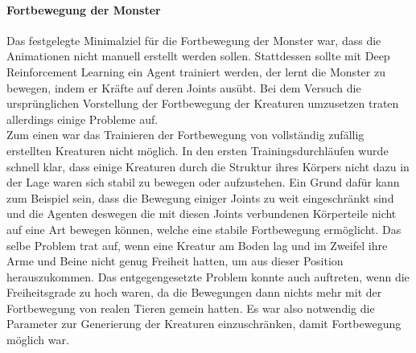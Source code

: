 \paragraph{Fortbewegung der Monster} \fup

Das festgelegte Minimalziel für die Fortbewegung der Monster war, dass die Animationen nicht manuell erstellt werden sollen. 
Stattdessen sollte mit Deep Reinforcement Learning ein Agent trainiert werden, der lernt die Monster zu bewegen, indem er Kräfte auf deren Joints ausübt.
Bei dem Versuch die ursprünglichen Vorstellung der Fortbewegung der Kreaturen umzusetzen traten allerdings einige Probleme auf.\\

Zum einen war das Trainieren der Fortbewegung von vollständig zufällig erstellten Kreaturen nicht möglich. 
In den ersten Trainingsdurchläufen wurde schnell klar, dass einige Kreaturen durch die Struktur ihres Körpers nicht dazu in der Lage waren sich stabil zu bewegen oder aufzustehen.
Ein Grund dafür kann zum Beispiel sein, dass die Bewegung einiger Joints zu weit eingeschränkt sind und die Agenten deswegen die mit diesen Joints verbundenen Körperteile nicht auf eine Art bewegen können, welche eine stabile Fortbewegung ermöglicht. Das selbe Problem trat auf, wenn eine Kreatur am Boden lag und im Zweifel ihre Arme und Beine nicht genug Freiheit hatten, um aus dieser Position herauszukommen.
Das entgegengesetzte Problem konnte auch auftreten, wenn die Freiheitsgrade zu hoch waren, da die Bewegungen dann nichts mehr mit der Fortbewegung von realen Tieren gemein hatten. Es war also notwendig die Parameter zur Generierung der Kreaturen einzuschränken, damit Fortbewegung möglich war.\\

